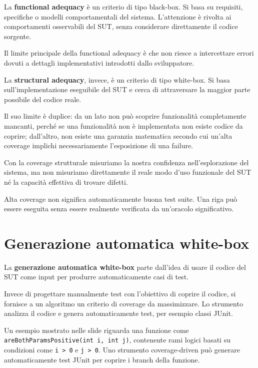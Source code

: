 La \textbf{functional adequacy} è un criterio di tipo black-box. Si basa su requisiti, specifiche o modelli comportamentali del sistema. L'attenzione è rivolta ai comportamenti osservabili del SUT, senza considerare direttamente il codice sorgente.

\begin{notaslide}
Il limite principale della functional adequacy è che non riesce a intercettare errori dovuti a dettagli implementativi introdotti dallo sviluppatore.
\end{notaslide}

La \textbf{structural adequacy}, invece, è un criterio di tipo white-box. Si basa sull'implementazione eseguibile del SUT e cerca di attraversare la maggior parte possibile del codice reale.

Il suo limite è duplice: da un lato non può scoprire funzionalità completamente mancanti, perché se una funzionalità non è implementata non esiste codice da coprire; dall'altro, non esiste una garanzia matematica secondo cui un'alta coverage implichi necessariamente l'esposizione di una failure.

\begin{notaprof}
Con la coverage strutturale misuriamo la nostra confidenza nell'esplorazione del sistema, ma non misuriamo direttamente il reale modo d'uso funzionale del SUT né la capacità effettiva di trovare difetti.
\end{notaprof}

\begin{notaesame}
Alta coverage non significa automaticamente buona test suite. Una riga può essere eseguita senza essere realmente verificata da un'oracolo significativo.
\end{notaesame}

\section{Generazione automatica white-box}

La \textbf{generazione automatica white-box} parte dall'idea di usare il codice del SUT come input per produrre automaticamente casi di test.

Invece di progettare manualmente test con l'obiettivo di coprire il codice, si fornisce a un algoritmo un criterio di coverage da massimizzare. Lo strumento analizza il codice e genera automaticamente test, per esempio classi JUnit.

\begin{notaslide}
Un esempio mostrato nelle slide riguarda una funzione come \texttt{areBothParamsPositive(int i, int j)}, contenente rami logici basati su condizioni come \texttt{i > 0} e \texttt{j > 0}. Uno strumento coverage-driven può generare automaticamente test JUnit per coprire i branch della funzione.
\end{notaslide}

